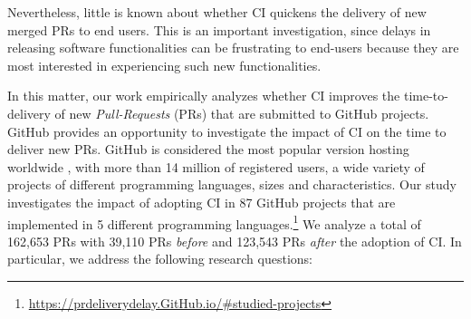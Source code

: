 	Nevertheless, little is known about whether CI quickens the delivery of new
	merged PRs to end users. This is an important investigation, since delays in
	releasing software functionalities can be frustrating to end-users because they
	are most interested in experiencing such new functionalities. 
	
	
	
	
	In this matter, our work empirically analyzes whether CI improves the
	time-to-delivery of new {\em Pull-Requests} (PRs) that are submitted to GitHub
	projects. GitHub provides an opportunity to investigate the impact of CI on the
	time to deliver new PRs. GitHub is considered the most popular version hosting
	worldwide \cite{Gousios2012-ys}, with more than 14 million of registered users,
	a wide variety of projects of different programming languages, sizes and
	characteristics. Our study investigates the impact of adopting CI in 87 GitHub
	projects that are implemented in 5 different programming
	languages.\footnote{\url{https://prdeliverydelay.GitHub.io/\#studied-projects}}
	We analyze a total of 162,653 PRs with 39,110 PRs \textit{before} and 123,543
	PRs \textit{after} the adoption of CI. In particular, we address the following
	research questions:
	
